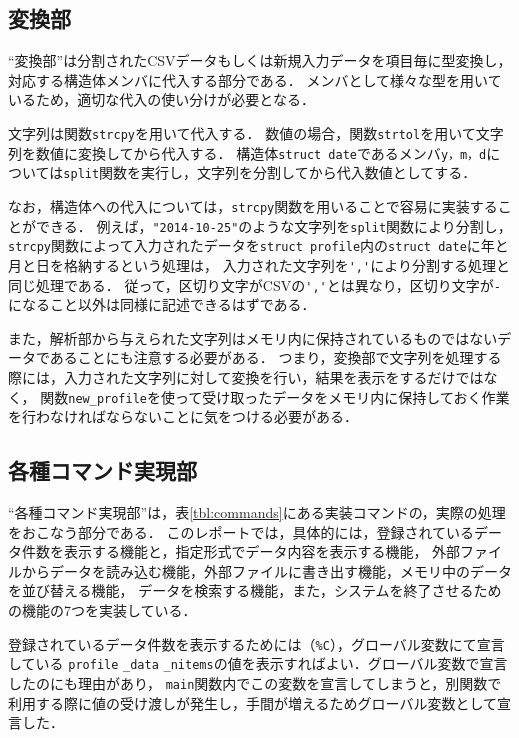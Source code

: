 \documentclass[a4j,11pt]{jarticle}
\begin{document}
\subsection{変換部} \label{sec:exchange}

``変換部''は分割されたCSVデータもしくは新規入力データを項目毎に型変換し，
対応する構造体メンバに代入する部分である．
メンバとして様々な型を用いているため，適切な代入の使い分けが必要となる．

文字列は関数\verb|strcpy|を用いて代入する．
数値の場合，関数\verb|strtol|を用いて文字列を数値に変換してから代入する．
構造体\verb|struct date|であるメンバ\verb|y，m，d|については\verb|split|関数を実行し，文字列を分割してから代入数値としてする．

なお，構造体への代入については，\verb|strcpy|関数を用いることで容易に実装することができる．
例えば，\verb|"2014-10-25"|のような文字列を\verb|split|関数により分割し，
\verb|strcpy|関数によって入力されたデータを\verb|struct profile|内の\verb|struct date|に年と月と日を格納するという処理は，
入力された文字列を\verb|','|により分割する処理と同じ処理である．
従って，区切り文字がCSVの\verb|','|とは異なり，区切り文字が\verb|-|になること以外は同様に記述できるはずである．

また，解析部から与えられた文字列はメモリ内に保持されているものではないデータであることにも注意する必要がある．
つまり，変換部で文字列を処理する際には，入力された文字列に対して変換を行い，結果を表示をするだけではなく，
関数\verb|new_profile|を使って受け取ったデータをメモリ内に保持しておく作業を行わなければならないことに気をつける必要がある．

\subsection{各種コマンド実現部} \label{sec:command}

``各種コマンド実現部''は，表\ref{tbl:commands}にある実装コマンドの，実際の処理をおこなう部分である．
このレポートでは，具体的には，登録されているデータ件数を表示する機能と，指定形式でデータ内容を表示する機能，
外部ファイルからデータを読み込む機能，外部ファイルに書き出す機能，メモリ中のデータを並び替える機能，
データを検索する機能，また，システムを終了させるための機能の7つを実装している．

登録されているデータ件数を表示するためには（\verb|%C|），グローバル変数にて宣言している
\verb|profile| \verb|_data| \verb|_nitems|の値を表示すればよい．グローバル変数で宣言したのにも理由があり，
\verb|main|関数内でこの変数を宣言してしまうと，別関数で利用する際に値の受け渡しが発生し，手間が増えるためグローバル変数として宣言した．
\end{document}

